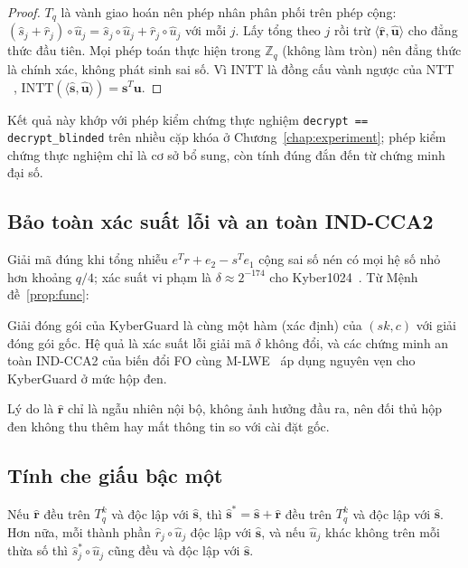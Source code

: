 \documentclass[../LuanVan.tex]{subfiles}
\begin{document}
\begin{proof}
$T_q$ là vành giao hoán nên phép nhân phân phối trên phép cộng: $(\hat{s}_j+\hat{r}_j)\circ\hat{u}_j=\hat{s}_j\circ\hat{u}_j+\hat{r}_j\circ\hat{u}_j$ với mỗi $j$. Lấy tổng theo $j$ rồi trừ $\langle\hat{\mathbf{r}},\hat{\mathbf{u}}\rangle$ cho đẳng thức đầu tiên. Mọi phép toán thực hiện trong $\mathbb{Z}_q$ (không làm tròn) nên đẳng thức là chính xác, không phát sinh sai số. Vì $\mathrm{INTT}$ là đồng cấu vành ngược của $\mathrm{NTT}$~\cite{Avanzi21}, $\mathrm{INTT}(\langle\hat{\mathbf{s}},\hat{\mathbf{u}}\rangle)=\mathbf{s}^T\mathbf{u}$.
\end{proof}
 
Kết quả này khớp với phép kiểm chứng thực nghiệm \texttt{decrypt == decrypt\_blinded} trên nhiều cặp khóa ở Chương~\ref{chap:experiment}; phép kiểm chứng thực nghiệm chỉ là cơ sở bổ sung, còn tính đúng đắn đến từ chứng minh đại số.
 
\subsection{Bảo toàn xác suất lỗi và an toàn IND-CCA2}
 
Giải mã đúng khi tổng nhiễu $e^{T}r+e_2-s^{T}e_1$ cộng sai số nén có mọi hệ số nhỏ hơn khoảng $q/4$; xác suất vi phạm là $\delta\approx2^{-174}$ cho Kyber1024~\cite{Avanzi21}. Từ Mệnh đề~\ref{prop:func}:
 
\begin{hequa}\label{cor:cca}
Giải đóng gói của KyberGuard là cùng một hàm (xác định) của $(sk,c)$ với giải đóng gói gốc. Hệ quả là xác suất lỗi giải mã $\delta$ không đổi, và các chứng minh an toàn IND-CCA2 của biến đổi FO cùng M-LWE~\cite{hhk2017,LangloisStehle15} áp dụng nguyên vẹn cho KyberGuard ở mức hộp đen.
\end{hequa}
 
Lý do là $\hat{\mathbf{r}}$ chỉ là ngẫu nhiên nội bộ, không ảnh hưởng đầu ra, nên đối thủ hộp đen không thu thêm hay mất thông tin so với cài đặt gốc.
 
\subsection{Tính che giấu bậc một}
 
\begin{menhde}\label{prop:hide}
Nếu $\hat{\mathbf{r}}$ đều trên $T_q^k$ và độc lập với $\hat{\mathbf{s}}$, thì $\hat{\mathbf{s}}^{*}=\hat{\mathbf{s}}+\hat{\mathbf{r}}$ đều trên $T_q^k$ và độc lập với $\hat{\mathbf{s}}$. Hơn nữa, mỗi thành phần $\hat{r}_j\circ\hat{u}_j$ độc lập với $\hat{\mathbf{s}}$, và nếu $\hat{u}_j$ khác không trên mỗi thừa số thì $\hat{s}^{*}_j\circ\hat{u}_j$ cũng đều và độc lập với $\hat{\mathbf{s}}$.
\end{menhde}
 
\end{document}
